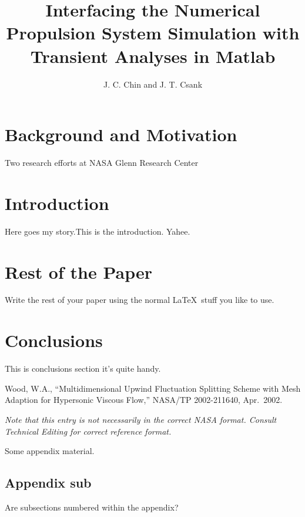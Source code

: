 \documentclass[]             %
{NASA}                       %
\title{Interfacing the Numerical Propulsion System Simulation with Transient Analyses in Matlab}
\author{J. C. Chin and J. T. Csank} %
\begin{document}

\section{Background and Motivation}
Two research efforts at NASA Glenn Research Center

\section{Introduction}
Here goes my story.This is the introduction.
Yahee.

\section{Rest of the Paper}
Write the rest of your paper using the normal \LaTeX\ stuff you like to
use.

\section{Conclusions}
This is conclusions section it's quite handy.

\begin{thebibliography}{WoodTP}
 Wood, W.A., ``Multidimensional Upwind
  Fluctuation Splitting Scheme with Mesh Adaption for Hypersonic Viscous
  Flow,'' NASA/TP 2002-211640, Apr.~2002.
\end{thebibliography}
{\em Note that this entry is not necessarily in the correct NASA
  format. Consult Technical Editing for correct reference format.}

\newpage
\appendix

Some appendix material.

\subsection{Appendix sub}
Are subsections numbered within the appendix?

\end{document}
